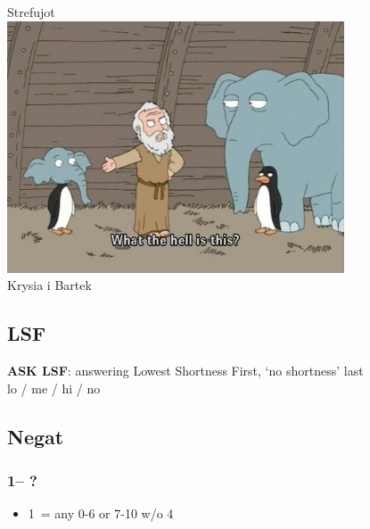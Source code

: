\documentclass[12pt, a4paper]{report}
\renewcommand{\lsf}{{\color{BrickRed}\textbf{ASK LSF}}}
\begin{document}
\begin{titlepage}
    \centering
    \vspace*{2cm}
    {\Huge \clubs Strefujot \clubs\\}
    \vspace{1.5cm}
    \includegraphics[width=10cm]{noe.jpg}\\
    \vspace{1cm}
    {\Large Krysia i Bartek\\}
\end{titlepage}

\begin{bidpage}
\section{LSF}

\lsf: answering Lowest Shortness First, `no shortness' last\\
lo / me / hi / no
\end{bidpage}

\begin{bidpage}
\section{Negat}

\subsubsection*{1\clubs -- ?}
\begin{itemize}
    \item 1\diams\ = any 0-6 or 7-10 w/o 4\major
\end{itemize}
\end{bidpage}
\end{document}
